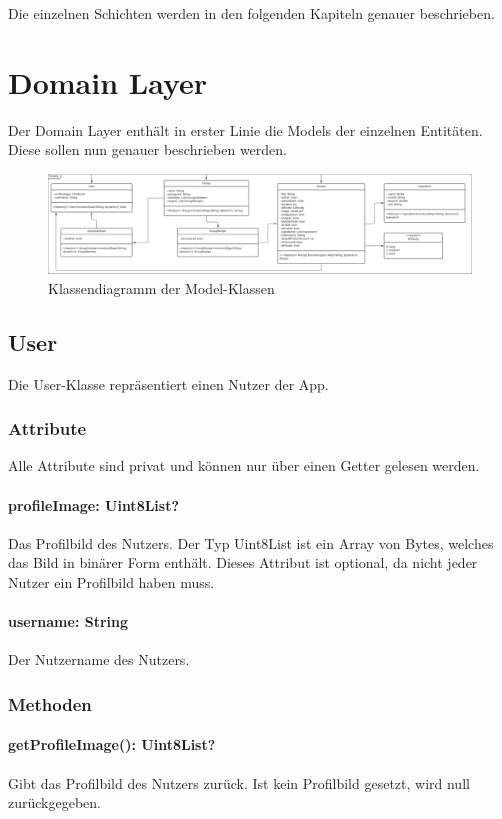\documentclass[parskip=full]{scrartcl}
\newcommand{\changelocaltocdepth}[1]{%
  \addtocontents{toc}{\protect\setcounter{tocdepth}{#1}}%
  \setcounter{tocdepth}{#1}%
}
\begin{document}
Die einzelnen Schichten werden in den folgenden Kapiteln genauer beschrieben.

\newpage

\section{Domain Layer}
\changelocaltocdepth{2}
Der Domain Layer enthält in erster Linie die Models der einzelnen Entitäten. Diese sollen nun genauer beschrieben werden.
\begin{figure}[htp]
    \centering
    \includegraphics[width = \textwidth]{images/domainLayer/domainLayer.pdf}
    \caption{Klassendiagramm der Model-Klassen}
    \label{fig:domain-layer}
\end{figure}

\subsection{User}
Die User-Klasse repräsentiert einen Nutzer der App.
\subsubsection{Attribute}
Alle Attribute sind privat und können nur über einen Getter gelesen werden.
\paragraph{profileImage: Uint8List?}
Das Profilbild des Nutzers. Der Typ Uint8List ist ein Array von Bytes, welches das Bild in binärer Form enthält. Dieses Attribut ist optional, da nicht jeder Nutzer ein Profilbild haben muss.
\paragraph{username: String}
Der Nutzername des Nutzers.

\subsubsection{Methoden}
\paragraph{getProfileImage(): Uint8List?}
Gibt das Profilbild des Nutzers zurück. Ist kein Profilbild gesetzt, wird null zurückgegeben.
\end{document}
